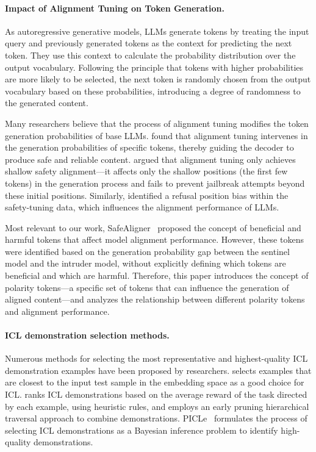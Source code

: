 \paragraph{Impact of Alignment Tuning on Token Generation.} As autoregressive generative models, LLMs generate tokens by treating the input query and previously generated tokens as the context for predicting the next token.
They use this context to calculate the probability distribution over the output vocabulary. 
Following the principle that tokens with higher probabilities are more likely to be selected, the next token is randomly chosen from the output vocabulary based on these probabilities, introducing a degree of randomness to the generated content.

Many researchers believe that the process of alignment tuning modifies the token generation probabilities of base LLMs. \citet{DBLP:conf/iclr/LinRLDSCB024} found that alignment tuning intervenes in the generation probabilities of specific tokens, thereby guiding the decoder to produce safe and reliable content. \citet{DBLP:journals/corr/abs-2406-05946} argued that alignment tuning only achieves shallow safety alignment—it affects only the shallow positions (the first few tokens) in the generation process and fails to prevent jailbreak attempts beyond these initial positions. Similarly, \citet{DBLP:journals/corr/abs-2407-09121} identified a refusal position bias within the safety-tuning data, which influences the alignment performance of LLMs.

Most relevant to our work, SafeAligner~\citep{huang2024safealigner} proposed the concept of beneficial and harmful tokens that affect model alignment performance. However, these tokens were identified based on the generation probability gap between the sentinel model and the intruder model, without explicitly defining which tokens are beneficial and which are harmful. Therefore, this paper introduces the concept of polarity tokens—a specific set of tokens that can influence the generation of aligned content—and analyzes the relationship between different polarity tokens and alignment performance.

\paragraph{ICL demonstration selection methods.} Numerous methods for selecting the most representative and highest-quality ICL demonstration examples have been proposed by researchers. \citet{liu2022makes} selects examples that are closest to the input test sample in the embedding space as a good choice for ICL. \citet{DBLP:conf/emnlp/HuaQH24} ranks ICL demonstrations based on the average reward of the task directed by each example, using heuristic rules, and employs an early pruning hierarchical traversal approach to combine demonstrations. PICLe~\citep{DBLP:conf/icml/ChoiL24} formulates the process of selecting ICL demonstrations as a Bayesian inference problem to identify high-quality demonstrations. 

